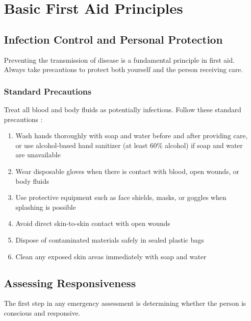 \chapter{Basic First Aid Principles}\label{ch:basic_principles}

\section{Infection Control and Personal Protection}

Preventing the transmission of disease is a fundamental principle in first aid. Always take precautions to protect both yourself and the person receiving care.

\subsection{Standard Precautions}

Treat all blood and body fluids as potentially infectious. Follow these standard precautions \cite{cdc,who_hand_hygiene}:

\begin{enumerate}[leftmargin=*]
  \item Wash hands thoroughly with soap and water before and after providing care, or use alcohol-based hand sanitizer (at least 60\% alcohol) if soap and water are unavailable
  \item Wear disposable gloves when there is contact with blood, open wounds, or body fluids
  \item Use protective equipment such as face shields, masks, or goggles when splashing is possible
  \item Avoid direct skin-to-skin contact with open wounds
  \item Dispose of contaminated materials safely in sealed plastic bags
  \item Clean any exposed skin areas immediately with soap and water
\end{enumerate}

\section{Assessing Responsiveness}

The first step in any emergency assessment is determining whether the person is conscious and responsive.

